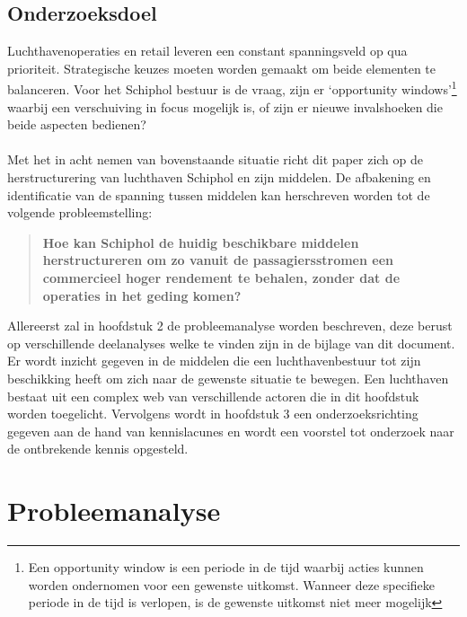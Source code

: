 \section{Onderzoeksdoel}
Luchthavenoperaties en retail leveren een constant spanningsveld op qua prioriteit. Strategische keuzes moeten worden gemaakt om beide elementen te balanceren. Voor het Schiphol bestuur is de vraag, zijn er ‘opportunity windows’\footnote{Een opportunity window is een periode in de tijd waarbij acties kunnen worden ondernomen voor een gewenste uitkomst. Wanneer deze specifieke periode in de tijd is verlopen, is de gewenste uitkomst niet meer mogelijk}  waarbij een verschuiving in focus mogelijk is, of zijn er nieuwe invalshoeken die beide aspecten bedienen?
\\ \\
Met het in acht nemen van bovenstaande situatie richt dit paper zich op de herstructurering van luchthaven Schiphol en zijn middelen. De afbakening en identificatie van de spanning tussen middelen kan herschreven worden tot de volgende probleemstelling:
\begin{quote}
    \textbf{Hoe kan Schiphol de huidig beschikbare middelen herstructureren om zo vanuit de passagiersstromen een commercieel hoger rendement te behalen, zonder dat de operaties in het geding komen?}
\end{quote}
Allereerst zal in hoofdstuk 2 de probleemanalyse worden beschreven, deze berust op verschillende deelanalyses welke te vinden zijn in de bijlage van dit document. Er wordt inzicht gegeven in de middelen die een luchthavenbestuur tot zijn beschikking heeft om zich naar de gewenste situatie te bewegen. Een luchthaven bestaat uit een complex web van verschillende actoren die in dit hoofdstuk worden toegelicht. Vervolgens wordt in hoofdstuk 3 een onderzoeksrichting gegeven aan de hand van kennislacunes en wordt een voorstel tot onderzoek naar de ontbrekende kennis opgesteld.
\chapter{Probleemanalyse}




